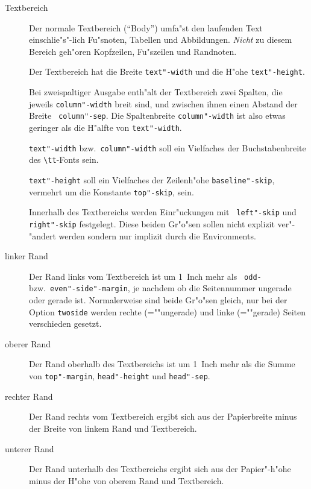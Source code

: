 \begin{description}

\item[Textbereich]
        Der normale Textbereich ("`Body"') umfa"st den laufenden 
        Text einschlie"s"-lich Fu"snoten, Tabellen und Abbildungen. 
        \emph{Nicht} zu diesem Bereich geh"oren Kopfzeilen, 
        Fu"szeilen und Randnoten.

        Der Textbereich hat die Breite {\tt\bs text"-width} und die 
        H"ohe {\tt\bs text"-height}.

        Bei zweispaltiger Ausgabe enth"alt der Textbereich zwei 
        Spalten, die jeweils {\tt\bs column"-width} breit sind, und 
        zwischen ihnen einen Abstand der Breite {\tt\bs 
        column"-sep}. Die Spaltenbreite {\tt\bs column"-width} ist also 
        etwas geringer als die H"alfte von {\tt\bs text"-width}.

        {\tt\bs text"-width} bzw.\ {\tt\bs column"-width} soll ein 
        Vielfaches der Buchstabenbreite des \verb|\tt|-Fonts sein.

        {\tt\bs text"-height} soll ein Vielfaches der 
        Zeilenh"ohe {\tt\bs baseline"-skip}, vermehrt um die Konstante 
        {\tt\bs top"-skip}, sein.

        Innerhalb des Textbereichs werden Einr"uckungen mit {\tt\bs 
        left"-skip} und {\tt\bs right"-skip} festgelegt. Diese beiden 
        Gr"o"sen sollen nicht explizit ver"-"andert werden sondern nur 
        implizit durch die Environments.

\item[linker Rand]
        Der Rand links vom Textbereich ist um 1~Inch mehr als {\tt\bs 
        odd-} bzw.\ {\tt\bs even"-side"-margin}, je nachdem ob die 
        Seitennummer ungerade oder gerade ist. Normalerweise sind beide 
        Gr"o"sen gleich, nur bei der Option {\tt twoside} werden rechte 
        (=""ungerade) und linke (=""gerade) Seiten verschieden gesetzt.

\item[oberer Rand]
        Der Rand oberhalb des Textbereichs ist um 1~Inch mehr als die 
        Summe von {\tt\bs top"-margin}, {\tt\bs head"-height} und 
        {\tt\bs head"-sep}.

\item[rechter Rand]
        Der Rand rechts vom Textbereich ergibt sich aus der 
        Papierbreite minus der Breite von linkem Rand und Textbereich.

\item[unterer Rand]
        Der Rand unterhalb des Textbereichs ergibt sich aus der 
        Papier"-h"ohe minus der H"ohe von oberem Rand und Textbereich.


\end{description}
